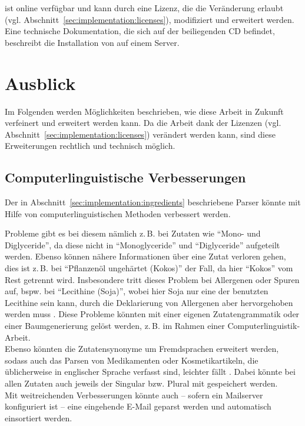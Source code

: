 \name ist online verfügbar und kann durch eine Lizenz, die die
Veränderung erlaubt (vgl. Abschnitt~\ref{sec:implementation:licenses}),
modifiziert und erweitert werden.
Eine technische Dokumentation, die sich auf der beiliegenden CD befindet, 
beschreibt die Installation von \name auf einem Server.

\section{Ausblick}
\label{sec:future_work}

Im Folgenden werden Möglichkeiten beschrieben, wie diese Arbeit
in Zukunft verfeinert und erweitert werden kann.
Da die Arbeit dank der Lizenzen (vgl. Abschnitt~\ref{sec:implementation:licenses})
verändert werden kann, sind diese Erweiterungen
rechtlich und technisch möglich.

\subsection{Computerlinguistische Verbesserungen}
\label{sec:future_work:coli}

Der in Abschnitt~\ref{sec:implementation:ingredients} beschriebene Parser könnte 
mit
Hilfe von computerlinguistischen Methoden verbessert werden.

Probleme gibt es bei diesem nämlich z.\,B. bei Zutaten wie
"`Mono- und Diglyceride"', da diese nicht in "`Monoglyceride"' und
"`Diglyceride"' aufgeteilt werden.
Ebenso können nähere
Informationen über eine Zutat verloren gehen, dies ist z.\,B. bei "`Pflanzenöl
ungehärtet (Kokos)"' der Fall, da hier "`Kokos"' vom Rest getrennt
wird. Insbesondere tritt dieses Problem bei Allergenen oder Spuren
auf, bspw. bei "`Lecithine (Soja)"', wobei hier Soja nur eine der
benutzten Lecithine sein kann, durch die Deklarierung von Allergenen aber
hervorgehoben werden muss .
Diese Probleme könnten mit einer eigenen Zutatengrammatik oder einer Baumgenerierung gelöst
werden, z.\,B. im Rahmen einer Computerlinguistik-Arbeit.\\
Ebenso könnten die Zutatensynonyme um Fremdsprachen erweitert werden,
sodass auch das Parsen von Medikamenten oder Kosmetikartikeln, die
üblicherweise in englischer Sprache verfasst sind, leichter fällt .
Dabei könnte bei allen Zutaten auch jeweils der Singular bzw. Plural
mit gespeichert werden.\\
Mit weitreichenden Verbesserungen könnte auch -- sofern ein Mailserver
konfiguriert ist -- eine eingehende E-Mail geparst werden und
automatisch einsortiert werden.

